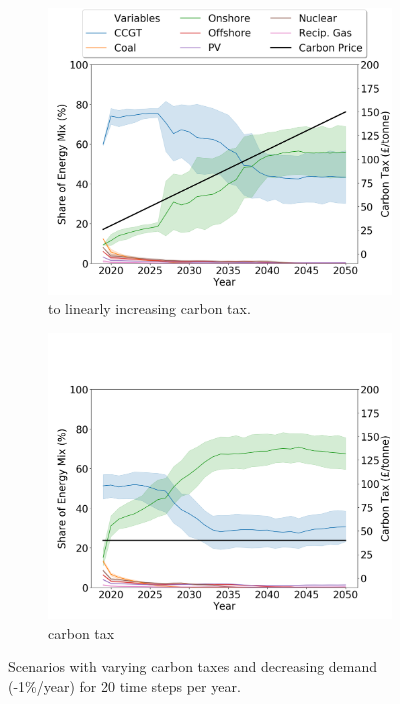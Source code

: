 \begin{figure}
	\centering
	\begin{subfigure}{.7\linewidth}
		\includegraphics[width=1\linewidth]{Chapter4/figures/scenarios/demand099-carbon18-datetime.png}
		\caption{ to  linearly increasing carbon tax.}
		\label{fig:demand99carbon18}
	\end{subfigure}
	\begin{subfigure}{.7\linewidth}
		\includegraphics[width=1\linewidth]{Chapter4/figures/scenarios/demand099-carbon40-datetime.png}
		\caption{{ carbon tax}}
		\label{fig:demand99carbon40}
	\end{subfigure}
	\caption{Scenarios with varying carbon taxes and decreasing demand (-1\%/year) for 20 time steps per year.}
\end{figure}






